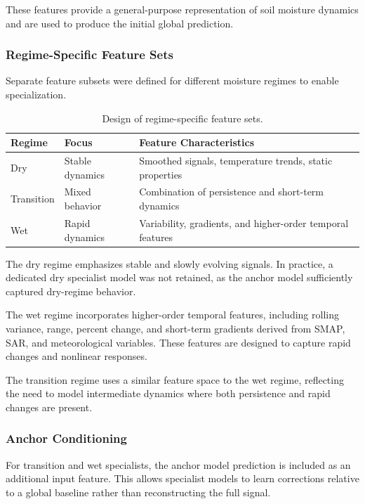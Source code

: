These features provide a general-purpose representation of soil moisture dynamics and are used to produce the initial global prediction.

\subsubsection*{Regime-Specific Feature Sets}

Separate feature subsets were defined for different moisture regimes to enable specialization.

\begin{table}[H]
\centering
\begin{tabular}{lll}
\toprule
\textbf{Regime} & \textbf{Focus} & \textbf{Feature Characteristics} \\
\midrule
Dry & Stable dynamics & Smoothed signals, temperature trends, static properties \\
Transition & Mixed behavior & Combination of persistence and short-term dynamics \\
Wet & Rapid dynamics & Variability, gradients, and higher-order temporal features \\
\bottomrule
\end{tabular}
\caption{Design of regime-specific feature sets.}
\end{table}

The dry regime emphasizes stable and slowly evolving signals. In practice, a dedicated dry specialist model was not retained, as the anchor model sufficiently captured dry-regime behavior.

The wet regime incorporates higher-order temporal features, including rolling variance, range, percent change, and short-term gradients derived from SMAP, SAR, and meteorological variables. These features are designed to capture rapid changes and nonlinear responses.

The transition regime uses a similar feature space to the wet regime, reflecting the need to model intermediate dynamics where both persistence and rapid changes are present.

\subsubsection*{Anchor Conditioning}

For transition and wet specialists, the anchor model prediction is included as an additional input feature. This allows specialist models to learn corrections relative to a global baseline rather than reconstructing the full signal.

